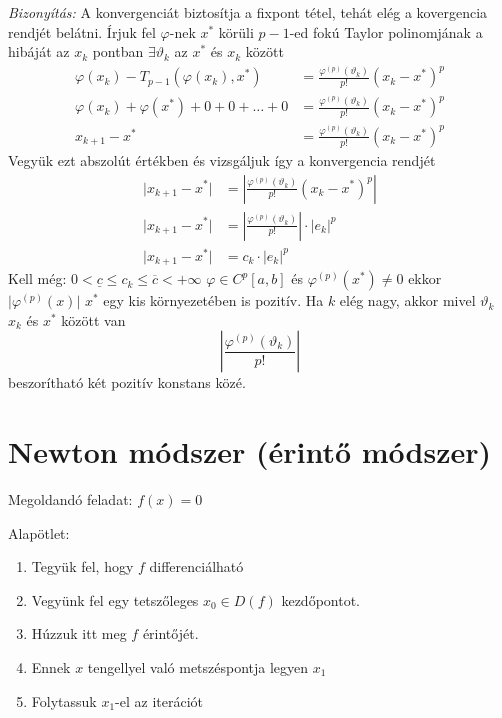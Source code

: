 \textit{Bizonyítás:}
A konvergenciát biztosítja a fixpont tétel, tehát elég a kovergencia rendjét belátni.
Írjuk fel $\varphi$-nek $x^{*}$ körüli $p-1$-ed fokú Taylor polinomjának a hibáját az $x_{k}$ pontban
$\exists \vartheta_{k}$ az $x^{*}$ és $x_{k}$ között
\begin{align*}
    \varphi(x_{k}) - T_{p-1}(\varphi(x_{k}), x^{*}) & = \frac{\varphi ^{(p)}(\vartheta_{k})}{p!} (x_{k} - x^{*})^{p} \\
    \varphi(x_{k}) + \varphi(x^{*}) + 0 + 0 + \dots + 0 & = \frac{\varphi ^{(p)}(\vartheta_{k})}{p!} (x_{k} - x^{*})^{p} \\
    x_{k+1} - x^{*} & = \frac{\varphi ^{(p)}(\vartheta_{k})}{p!} (x_{k} - x^{*})^{p}
\end{align*}
Vegyük ezt abszolút értékben és vizsgáljuk így a konvergencia rendjét
\begin{align*}
    \lvert x_{k+1} - x^{*} \rvert & = \left\lvert \frac{\varphi ^{(p)}(\vartheta_{k})}{p!} (x_{k} - x^{*})^{p} \right\rvert \\
    \lvert x_{k+1} - x^{*} \rvert & = \left\lvert \frac{\varphi ^{(p)}(\vartheta_{k})}{p!} \right\rvert \cdot \lvert e_{k} \rvert ^{p} \\
    \lvert x_{k+1} - x^{*} \rvert & = c_{k} \cdot \lvert e_{k} \rvert ^{p}
\end{align*}
Kell még: $0 < \underline{c} \leq c_{k} \leq \overline c < + \infty$
$\varphi \in C^{p}[a, b]$ és $\varphi ^{(p)}(x^{*}) \neq 0$ ekkor $\lvert \varphi ^{(p)}(x) \rvert$ $x^{*}$ egy kis környezetében is pozitív. Ha $k$ elég nagy, akkor mivel $\vartheta_{k}$ $x_{k}$ és $x^{*}$ között van
\begin{equation*}
    \left\lvert  \frac{\varphi ^{(p)}(\vartheta_{k})}{p!}  \right\rvert 
\end{equation*}
beszorítható két pozitív konstans közé.


\section{Newton módszer (érintő módszer)}
Megoldandó feladat: $f(x) = 0$

Alapötlet:
\begin{enumerate}
    \item Tegyük fel, hogy $f$ differenciálható
    \item Vegyünk fel egy tetszőleges $x_{0} \in D(f)$ kezdőpontot.
    \item Húzzuk itt meg $f$ érintőjét.
    \item Ennek $x$ tengellyel való metszéspontja legyen $x_{1}$
    \item Folytassuk $x_1$-el az iterációt
\end{enumerate}

